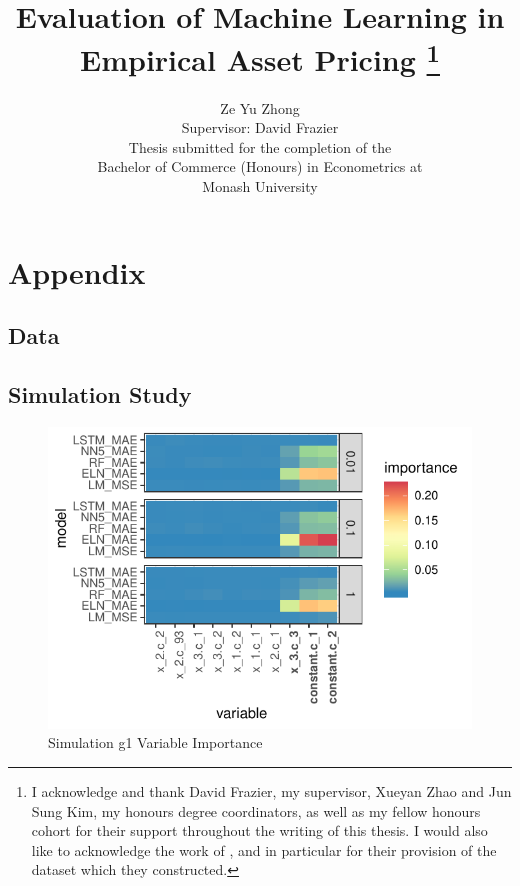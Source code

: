 \documentclass[11pt, a4paper, table]{article}
\title{Evaluation of Machine Learning in Empirical Asset Pricing
\thanks{I acknowledge and thank David Frazier, my supervisor, Xueyan Zhao and Jun Sung Kim, my honours degree coordinators, as well as my fellow honours cohort for their support throughout the writing of this thesis. I would also like to acknowledge the work of \cite{gu_empirical_2018}, and in particular for their provision of the dataset which they constructed.}
}
\author{Ze Yu Zhong \\
Supervisor: David Frazier \\ 
Thesis submitted for the completion of the \\
Bachelor of Commerce (Honours) in Econometrics at \\
Monash University}
\begin{document}
\section{Appendix}

\subsection{Data}

\subsection{Simulation Study}

\FloatBarrier





\newpage



\FloatBarrier


\begin{figure}
	\includegraphics[]{../Results/simulation/graphics/simulation_g1_vi.pdf}
	\caption{Simulation g1 Variable Importance}
\end{figure}
\end{document}
